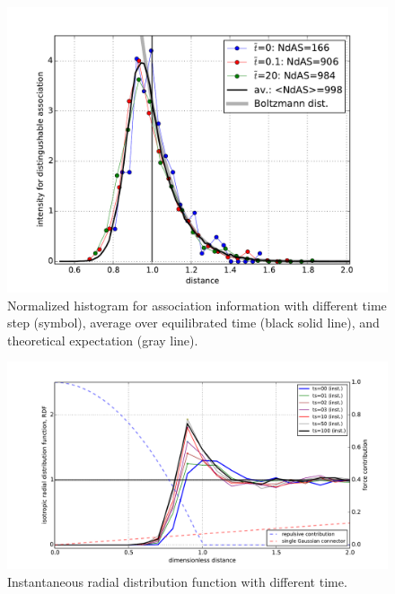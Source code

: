 \documentclass[10pt, a4paper]{article}
\begin{document}
\begin{figure}
  \centering
  \includegraphics[width=\textwidth]{figures/check_Boltzmann_dist.pdf}
  \caption{Normalized histogram for association information with different time step (symbol), average over equilibrated time (black solid line), and theoretical expectation (gray line).}
  \label{fig:Boltzmann_dist}
\end{figure}

\begin{figure}
  \centering
  \includegraphics[width=\textwidth]{figures/RDF_NP1350_inst_EQ.pdf}
  \caption{Instantaneous radial distribution function with different time.}
  \label{fig:RDF_NP1350_INST}
\end{figure}
\end{document}
